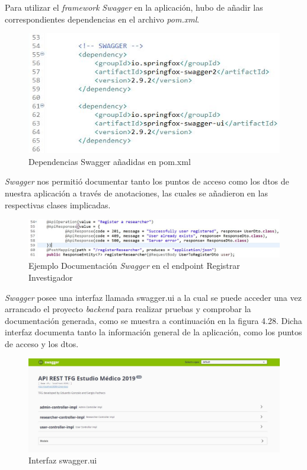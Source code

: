         Para utilizar el \textit{framework} \textit{Swagger} en la aplicación, hubo de añadir las correspondientes dependencias en el archivo \textit{pom.xml}.
        \newline
        
        \begin{figure}[h]
            \centering
            \includegraphics[width=1\textwidth]{images/swagger.JPG}
            \caption{Dependencias Swagger añadidas en pom.xml}
        \end{figure}
        
        \textit{Swagger} nos permitió documentar tanto los puntos de acceso como los dtos de nuestra aplicación a través de anotaciones, las cuales se añadieron en las respectivas clases implicadas.
        
          \begin{figure}[h]
            \centering
            \includegraphics[width=1\textwidth]{images/swaggerexample.JPG}
            \caption{Ejemplo Documentación \textit{Swagger} en el endpoint Registrar Investigador}
        \end{figure}
        
        
         \textit{Swagger} posee una interfaz llamada swagger.ui a la cual se puede acceder una vez arrancado el proyecto \textit{backend} para realizar pruebas y comprobar la documentación generada, como se muestra a continuación en la figura 4.28. Dicha interfaz documenta tanto la información general de la aplicación, como los puntos de acceso y los dtos.
         \newline
         
          \begin{figure}[h]
            \centering
            \includegraphics[width=1\textwidth]{images/swaggergeneral.JPG}
            \caption{Interfaz swagger.ui}
        \end{figure}
        
